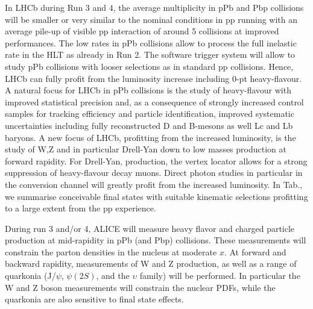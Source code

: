 \documentclass[../report.tex]{subfiles}
\begin{document}
In LHCb during Run 3 and 4, the average multiplicity in pPb and Pbp collisions will be smaller or very similar to the nominal conditions in pp running with an average  pile-up of visible pp interaction of around 5 collisions at improved performances. The low rates in pPb collisions allow to process the full inelastic rate in the HLT as already in Run 2. The software trigger system will allow to study pPb collisions with looser selections as in standard pp collisions. Hence, LHCb can fully profit from the luminosity increase including 0-pt heavy-flavour.  A natural focus for LHCb in pPb collisions is the study of heavy-flavour with improved statistical precision and, as a consequence of strongly increased control samples for tracking efficiency and particle identification, improved systematic uncertainties including fully reconstructed D and B-mesons as well Lc and Lb baryons. A new focus of LHCb, profitting from the increased luminosity, is the study of W,Z and in particular Drell-Yan down to low masses production at forward rapidity. For Drell-Yan, production, the vertex locator allows for a strong suppression of heavy-flavour decay muons. Direct photon studies in particular in the conversion channel will greatly profit from the increased luminosity. In Tab., we summarise conceivable final states with suitable kinematic selections profitting to a large extent from the pp experience.

During run 3 and/or 4, ALICE will measure heavy flavor and charged particle production at mid-rapidity in pPb (and Pbp) collisions. These measurements will constrain the parton densities in the nucleus at moderate $x$. At forward and backward rapidity, measurements of W and Z production, as well as a range of quarkonia (J/$\psi$, $\psi(2S)$, and the $\upsilon$ family) will be performed. In particular the W and Z boson measurements will constrain the nuclear PDFs, while the quarkonia are also sensitive to final state effects.
\end{document}
